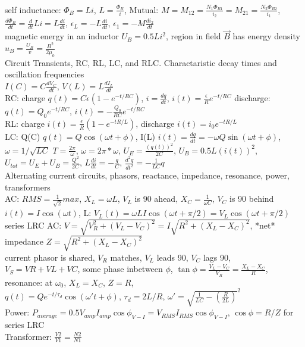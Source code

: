 \documentclass{article}
\begin{document}
\begin{large}
\\self inductance: $\Phi_B=Li$, $L=\frac{\Phi_B}{i}$, Mutual: $M=M_{12}=\frac{N_1\Phi_{B1}}{i_2}=M_{21}=\frac{N_2\Phi_{B2}}{i_1}$, $\frac{d\Phi_B}{dt}=\frac{d}{dt}Li=L\frac{di}{dt}$, $\epsilon_L=-L\frac{di}{dt}$, $\epsilon_1=-M\frac{di_2}{dt}$
\\magnetic energy in an inductor $U_B=0.5Li^2$, region in field $\vec B$ has energy density $u_B=\frac{U_B}{v}=\frac{B^2}{2\mu_0}$
\\\indent Circuit Transients, RC, RL, LC, and RLC. Charactaristic decay times and oscillation frequencies
\\$I(C)=C\frac{dV_C}{dt}$, $V(L)=L\frac{dI_L}{dt}$
\\RC: charge $q(t)=C\epsilon(1-e^{-t/RC})$, $i=\frac{dq}{dt}$, $i(t)=\frac{\epsilon}{R}e^{-t/RC}$ discharge: $q(t)=Q_0e^{-t/RC}$, $i(t)=-\frac{Q_0}{RC}e^{-t/RC}$
\\RL: charge $i(t)=\frac{\epsilon}{R}(1-e^{-tR/L})$, discharge $i(t)=i_0e^{-tR/L}$
\\LC: Q(C) $q(t)=Q\cos(\omega t+\phi)$, I(L) $i(t)=\frac{dq}{dt}=-\omega Q\sin(\omega t+\phi)$, $\omega=1/\sqrt{LC}$ $T=\frac{2\pi}{\omega}$, $\omega=2\pi*\omega$, $U_E=\frac{(q(t))^2}{2C}$, $U_B=0.5L(i(t))^2$, $U_{tot}=U_E+U_B=\frac{Q^2}{2C}$, $L\frac{di}{dt}=-\frac{q}{C}$, $\frac{d^2q}{dt^2}=-\frac{1}{LC}q$
\\\indent Alternating current circuits, phasors, reactance, impedance, resonance, power, transformers
\\AC: $RMS=\frac{1}{\sqrt{2}} max$, $X_L=\omega L$, $V_L$ is 90 ahead, $X_C=\frac{1}{\omega C}$, $V_C$ is 90 behind
\\$i(t)=I\cos(\omega t)$,  L: $V_L(t)=\omega LI\cos(\omega t+\pi/2)=V_L\cos(\omega t+\pi/2)$
\\series LRC AC: $V=\sqrt{V_R^2+(V_L-V_C)^2}=I\sqrt{R^2+(X_L-X_C)^2}$, *net* impedance $Z=\sqrt{R^2+(X_L-X_C)^2}$
\\current phasor is shared, $V_R$ matches, $V_L$ leads 90, $V_C$ lags 90, $V_S=VR+VL+VC$, some phase inbetween $\phi$, $\tan\phi=\frac{V_L-V_C}{V_R}=\frac{X_L-X_C}{R}$, resonance: at $\omega_0$, $X_L=X_C$, $Z=R$, 
\\$q(t)=Qe^{-t/\tau_d}\cos(\omega't+\phi)$, $\tau_d=2L/R$, $\omega'=\sqrt{\frac{1}{LC}-(\frac{R}{2L})}^2$
\\Power: $P_{average}=0.5V_{amp}I_{amp}\cos\phi_{V-I}=V_{RMS}I_{RMS}\cos\phi_{V-I}$, $\cos\phi=R/Z$ for series LRC
\\Transformer: $\frac{V2}{V1}=\frac{N2}{N1}$
\\

\end{large}
\end{document}

